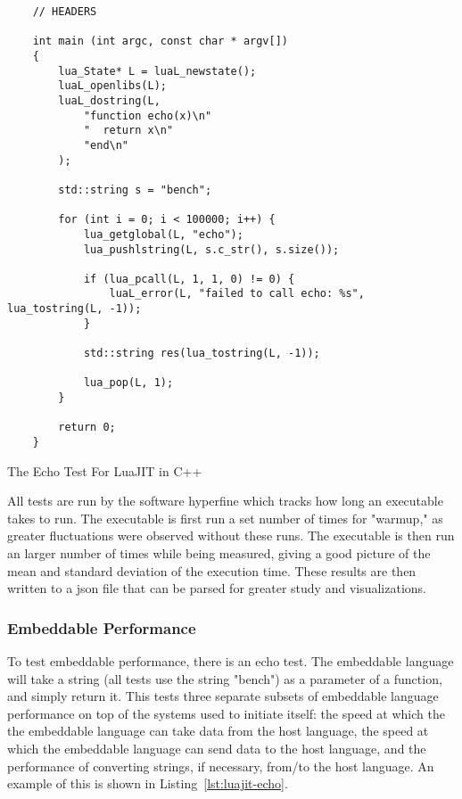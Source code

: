 \begin{listing}[H]
    \begin{verbatim}
    // HEADERS

    int main (int argc, const char * argv[])
    {
        lua_State* L = luaL_newstate();
        luaL_openlibs(L);
        luaL_dostring(L, 
            "function echo(x)\n"
            "  return x\n"
            "end\n"
        );

        std::string s = "bench";

        for (int i = 0; i < 100000; i++) {
            lua_getglobal(L, "echo");
            lua_pushlstring(L, s.c_str(), s.size());

            if (lua_pcall(L, 1, 1, 0) != 0) {
                luaL_error(L, "failed to call echo: %s", lua_tostring(L, -1));
            }

            std::string res(lua_tostring(L, -1));

            lua_pop(L, 1);
        }

        return 0;
    }
    \end{verbatim}
    \caption{The Echo Test For LuaJIT in C++}
    \label{lst:luajit-echo}
\end{listing}

All tests are run by the software hyperfine\cite{hyperfine} which tracks how long an executable takes to run. The executable is first run a set number of times for "warmup," as greater fluctuations were observed without these runs. The executable is then run an larger number of times while being measured, giving a good picture of the mean and standard deviation of the execution time. These results are then written to a json file that can be parsed for greater study and visualizations.

\subsubsection{Embeddable Performance}
To test embeddable performance, there is an echo test. The embeddable language will take a string (all tests use the string "bench") as a parameter of a function, and simply return it. This tests three separate subsets of embeddable language performance on top of the systems used to initiate itself: the speed at which the the embeddable language can take data from the host language, the speed at which the embeddable language can send data to the host language, and the performance of converting strings, if necessary, from/to the host language. An example of this is shown in Listing~\ref{lst:luajit-echo}.

